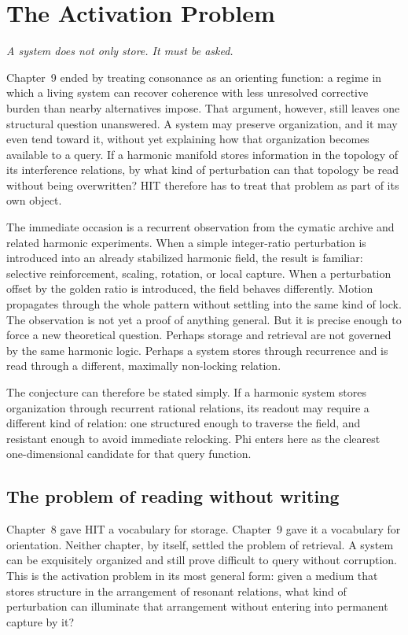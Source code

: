 \chapter{The Activation Problem}

\epigraph{\emph{A system does not only store. It must be asked.}}{}

Chapter~9 ended by treating consonance as an orienting function: a regime in which a living system can recover coherence with less unresolved corrective burden than nearby alternatives impose. That argument, however, still leaves one structural question unanswered. A system may preserve organization, and it may even tend toward it, without yet explaining how that organization becomes available to a query. If a harmonic manifold stores information in the topology of its interference relations, by what kind of perturbation can that topology be read without being overwritten? HIT therefore has to treat that problem as part of its own object.

The immediate occasion is a recurrent observation from the cymatic archive and related harmonic experiments. When a simple integer-ratio perturbation is introduced into an already stabilized harmonic field, the result is familiar: selective reinforcement, scaling, rotation, or local capture. When a perturbation offset by the golden ratio is introduced, the field behaves differently. Motion propagates through the whole pattern without settling into the same kind of lock. The observation is not yet a proof of anything general. But it is precise enough to force a new theoretical question. Perhaps storage and retrieval are not governed by the same harmonic logic. Perhaps a system stores through recurrence and is read through a different, maximally non-locking relation.

The conjecture can therefore be stated simply. If a harmonic system stores organization through recurrent rational relations, its readout may require a different kind of relation: one structured enough to traverse the field, and resistant enough to avoid immediate relocking. Phi enters here as the clearest one-dimensional candidate for that query function.

\section{The problem of reading without writing}

Chapter~8 gave HIT a vocabulary for storage. Chapter~9 gave it a vocabulary for orientation. Neither chapter, by itself, settled the problem of retrieval. A system can be exquisitely organized and still prove difficult to query without corruption. This is the activation problem in its most general form: given a medium that stores structure in the arrangement of resonant relations, what kind of perturbation can illuminate that arrangement without entering into permanent capture by it?

